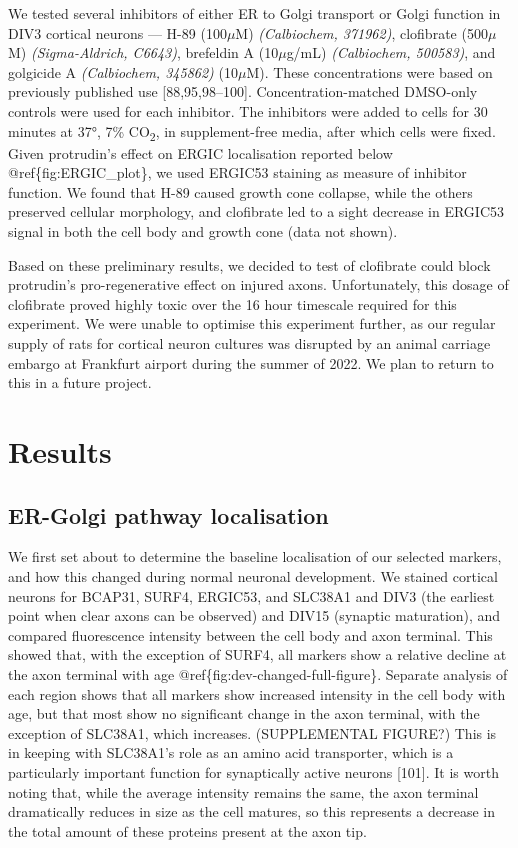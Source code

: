 \documentclass[
  12pt,
  a4paper,
]{book}
\begin{document}
We tested several inhibitors of either ER to Golgi transport or Golgi function in DIV3 cortical neurons --- H-89 (100\(\mu\)M) \emph{(Calbiochem, 371962)}, clofibrate (500\(\mu\)M) \emph{(Sigma-Aldrich, C6643)}, brefeldin A (10\(\mu\)g/mL) \emph{(Calbiochem, 500583)}, and golgicide A \emph{(Calbiochem, 345862)} (10\(\mu\)M). These concentrations were based on previously published use {[}88,95,98--100{]}. Concentration-matched DMSO-only controls were used for each inhibitor. The inhibitors were added to cells for 30 minutes at 37°, 7\% CO\textsubscript{2}, in supplement-free media, after which cells were fixed. Given protrudin's effect on ERGIC localisation reported below @ref\{fig:ERGIC\_plot\}, we used ERGIC53 staining as measure of inhibitor function. We found that H-89 caused growth cone collapse, while the others preserved cellular morphology, and clofibrate led to a sight decrease in ERGIC53 signal in both the cell body and growth cone (data not shown).

Based on these preliminary results, we decided to test of clofibrate could block protrudin's pro-regenerative effect on injured axons. Unfortunately, this dosage of clofibrate proved highly toxic over the 16 hour timescale required for this experiment. We were unable to optimise this experiment further, as our regular supply of rats for cortical neuron cultures was disrupted by an animal carriage embargo at Frankfurt airport during the summer of 2022. We plan to return to this in a future project.

\hypertarget{results-2}{%
\section{Results}\label{results-2}}

\hypertarget{er-golgi-pathway-localisation}{%
\subsection{ER-Golgi pathway localisation}\label{er-golgi-pathway-localisation}}

We first set about to determine the baseline localisation of our selected markers, and how this changed during normal neuronal development. We stained cortical neurons for BCAP31, SURF4, ERGIC53, and SLC38A1 and DIV3 (the earliest point when clear axons can be observed) and DIV15 (synaptic maturation), and compared fluorescence intensity between the cell body and axon terminal. This showed that, with the exception of SURF4, all markers show a relative decline at the axon terminal with age @ref\{fig:dev-changed-full-figure\}. Separate analysis of each region shows that all markers show increased intensity in the cell body with age, but that most show no significant change in the axon terminal, with the exception of SLC38A1, which increases. (SUPPLEMENTAL FIGURE?) This is in keeping with SLC38A1's role as an amino acid transporter, which is a particularly important function for synaptically active neurons {[}101{]}. It is worth noting that, while the average intensity remains the same, the axon terminal dramatically reduces in size as the cell matures, so this represents a decrease in the total amount of these proteins present at the axon tip.
\end{document}
